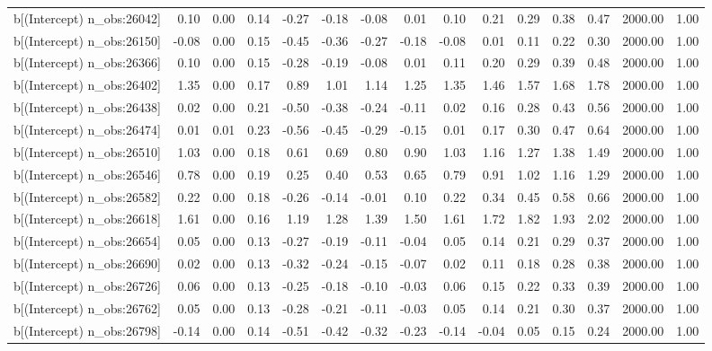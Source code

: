 \begin{table}[ht]
\begin{tabular}{rrrrrrrrrrrrrrr}
  b[(Intercept) n\_obs:26042] & 0.10 & 0.00 & 0.14 & -0.27 & -0.18 & -0.08 & 0.01 & 0.10 & 0.21 & 0.29 & 0.38 & 0.47 & 2000.00 & 1.00 \\ 
  b[(Intercept) n\_obs:26150] & -0.08 & 0.00 & 0.15 & -0.45 & -0.36 & -0.27 & -0.18 & -0.08 & 0.01 & 0.11 & 0.22 & 0.30 & 2000.00 & 1.00 \\ 
  b[(Intercept) n\_obs:26366] & 0.10 & 0.00 & 0.15 & -0.28 & -0.19 & -0.08 & 0.01 & 0.11 & 0.20 & 0.29 & 0.39 & 0.48 & 2000.00 & 1.00 \\ 
  b[(Intercept) n\_obs:26402] & 1.35 & 0.00 & 0.17 & 0.89 & 1.01 & 1.14 & 1.25 & 1.35 & 1.46 & 1.57 & 1.68 & 1.78 & 2000.00 & 1.00 \\ 
  b[(Intercept) n\_obs:26438] & 0.02 & 0.00 & 0.21 & -0.50 & -0.38 & -0.24 & -0.11 & 0.02 & 0.16 & 0.28 & 0.43 & 0.56 & 2000.00 & 1.00 \\ 
  b[(Intercept) n\_obs:26474] & 0.01 & 0.01 & 0.23 & -0.56 & -0.45 & -0.29 & -0.15 & 0.01 & 0.17 & 0.30 & 0.47 & 0.64 & 2000.00 & 1.00 \\ 
  b[(Intercept) n\_obs:26510] & 1.03 & 0.00 & 0.18 & 0.61 & 0.69 & 0.80 & 0.90 & 1.03 & 1.16 & 1.27 & 1.38 & 1.49 & 2000.00 & 1.00 \\ 
  b[(Intercept) n\_obs:26546] & 0.78 & 0.00 & 0.19 & 0.25 & 0.40 & 0.53 & 0.65 & 0.79 & 0.91 & 1.02 & 1.16 & 1.29 & 2000.00 & 1.00 \\ 
  b[(Intercept) n\_obs:26582] & 0.22 & 0.00 & 0.18 & -0.26 & -0.14 & -0.01 & 0.10 & 0.22 & 0.34 & 0.45 & 0.58 & 0.66 & 2000.00 & 1.00 \\ 
  b[(Intercept) n\_obs:26618] & 1.61 & 0.00 & 0.16 & 1.19 & 1.28 & 1.39 & 1.50 & 1.61 & 1.72 & 1.82 & 1.93 & 2.02 & 2000.00 & 1.00 \\ 
  b[(Intercept) n\_obs:26654] & 0.05 & 0.00 & 0.13 & -0.27 & -0.19 & -0.11 & -0.04 & 0.05 & 0.14 & 0.21 & 0.29 & 0.37 & 2000.00 & 1.00 \\ 
  b[(Intercept) n\_obs:26690] & 0.02 & 0.00 & 0.13 & -0.32 & -0.24 & -0.15 & -0.07 & 0.02 & 0.11 & 0.18 & 0.28 & 0.38 & 2000.00 & 1.00 \\ 
  b[(Intercept) n\_obs:26726] & 0.06 & 0.00 & 0.13 & -0.25 & -0.18 & -0.10 & -0.03 & 0.06 & 0.15 & 0.22 & 0.33 & 0.39 & 2000.00 & 1.00 \\ 
  b[(Intercept) n\_obs:26762] & 0.05 & 0.00 & 0.13 & -0.28 & -0.21 & -0.11 & -0.03 & 0.05 & 0.14 & 0.21 & 0.30 & 0.37 & 2000.00 & 1.00 \\ 
  b[(Intercept) n\_obs:26798] & -0.14 & 0.00 & 0.14 & -0.51 & -0.42 & -0.32 & -0.23 & -0.14 & -0.04 & 0.05 & 0.15 & 0.24 & 2000.00 & 1.00 \\ 

\end{tabular}
\end{table}
